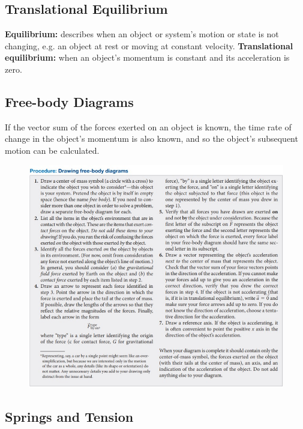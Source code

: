     \subsection{Translational Equilibrium}

        \textbf{Equilibrium:} describes when an object or system's motion or state is not changing, e.g. an object at rest or moving at constant velocity. \textbf{Translational equilibrium:} when an object's momentum
        is constant and its acceleration is zero.


    \pagebreak

    \subsection{Free-body Diagrams}

        If the vector sum of the forces exerted on an object is known, the time rate of change in the object's momentum is also known, and so the object's subsequent motion can be calculated.

        \begin{figure}[hbt!]
            \centering
            \includegraphics[]{Resources/FBDs}
        \end{figure}



    \subsection{Springs and Tension}

